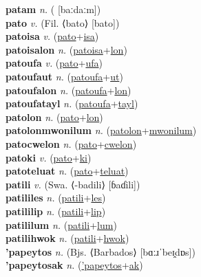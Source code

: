 \textbf{patam} \textit{n.} ( [baːdaːm])
 \label{patam} \\
\textbf{pato} \textit{v.} (Fil. ⟨bato⟩ [bato])
 \label{pato} \\
\textbf{patoisa} \textit{v.} (\hyperref[pato]{pato}+\hyperref[isa]{isa})
 \label{patoisa} \\
\textbf{patoisalon} \textit{n.} (\hyperref[patoisa]{patoisa}+\hyperref[lon]{lon})
 \label{patoisalon} \\
\textbf{patoufa} \textit{v.} (\hyperref[pato]{pato}+\hyperref[ufa]{ufa})
 \label{patoufa} \\
\textbf{patoufaut} \textit{n.} (\hyperref[patoufa]{patoufa}+\hyperref[ut]{ut})
 \label{patoufaut} \\
\textbf{patoufalon} \textit{n.} (\hyperref[patoufa]{patoufa}+\hyperref[lon]{lon})
 \label{patoufalon} \\
\textbf{patoufatayl} \textit{n.} (\hyperref[patoufa]{patoufa}+\hyperref[tayl]{tayl})
 \label{patoufatayl} \\
\textbf{patolon} \textit{n.} (\hyperref[pato]{pato}+\hyperref[lon]{lon})
 \label{patolon} \\
\textbf{patolonmwonilum} \textit{n.} (\hyperref[patolon]{patolon}+\hyperref[mwonilum]{mwonilum})
 \label{patolonmwonilum} \\
\textbf{patocwelon} \textit{n.} (\hyperref[pato]{pato}+\hyperref[cwelon]{cwelon})
 \label{patocwelon} \\
\textbf{patoki} \textit{v.} (\hyperref[pato]{pato}+\hyperref[ki]{ki})
 \label{patoki} \\
\textbf{patoteluat} \textit{n.} (\hyperref[pato]{pato}+\hyperref[teluat]{teluat})
 \label{patoteluat} \\
\textbf{patili} \textit{v.} (Swa. ⟨-badili⟩ [ɓaɗili])
 \label{patili} \\
\textbf{patililes} \textit{n.} (\hyperref[patili]{patili}+\hyperref[les]{les})
 \label{patililes} \\
\textbf{patililip} \textit{n.} (\hyperref[patili]{patili}+\hyperref[lip]{lip})
 \label{patililip} \\
\textbf{patililum} \textit{n.} (\hyperref[patili]{patili}+\hyperref[lum]{lum})
 \label{patililum} \\
\textbf{patilihwok} \textit{n.} (\hyperref[patili]{patili}+\hyperref[hwok]{hwok})
 \label{patilihwok} \\
\textbf{'papeytos} \textit{n.} (Bjs. ⟨Barbados⟩ [bɑːɹˈbeɪ̯dɒs])
 \label{'papeytos} \\
\textbf{'papeytosak} \textit{n.} (\hyperref['papeytos]{'papeytos}+\hyperref[ak]{ak})
